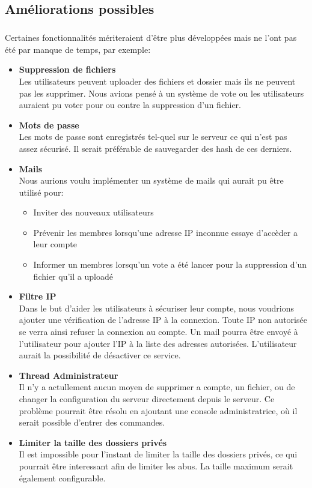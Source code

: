 \documentclass[12pt,a4paper,twoside]{article}
\begin{document}
		\subsection{Améliorations possibles} %
			\subparagraph*{}
				Certaines fonctionnalités mériteraient d'être plus développées mais ne l'ont pas été par manque de temps, par exemple:
				\begin{itemize}
					\item{} \textbf{Suppression de fichiers}\\
						Les utilisateurs peuvent uploader des fichiers et dossier mais ils ne peuvent pas les supprimer. Nous avions pensé à un système de vote ou les utilisateurs auraient pu voter pour ou contre la suppression d'un fichier.
					\item{} \textbf{Mots de passe}\\
						Les mots de passe sont enregistrés tel-quel sur le serveur ce qui n'est pas assez sécurisé. Il serait préférable de sauvegarder des hash de ces derniers.
					\item{} \textbf{Mails}\\
						Nous aurions voulu implémenter un système de mails qui aurait pu être utilisé pour:
						\begin{itemize}
							\item{} Inviter des nouveaux utilisateurs
							\item{} Prévenir les membres lorsqu'une adresse IP inconnue essaye d'accèder a leur compte
							\item{} Informer un membres lorsqu'un vote a été lancer pour la suppression d'un fichier qu'il a uploadé
						\end{itemize}
					\item{} \textbf{Filtre IP}\\
						Dans le but d'aider les utilisateurs à sécuriser leur compte, nous voudrions ajouter une vérification de l'adresse IP à la connexion. Toute IP non autorisée se verra ainsi refuser la connexion au compte. Un mail pourra être envoyé à l'utilisateur pour ajouter l'IP à la liste des adresses autorisées. L'utilisateur aurait la possibilité de désactiver ce service.
					\item{} \textbf{Thread Administrateur}\\
						Il n'y a actullement aucun moyen de supprimer a compte, un fichier, ou de changer la configuration du serveur directement depuis le serveur. Ce problème pourrait être résolu en ajoutant une console administratrice, où il serait possible d'entrer des commandes.
					\item{} \textbf{Limiter la taille des dossiers privés}\\
						Il est impossible pour l'instant de limiter la taille des dossiers privés, ce qui pourrait être interessant afin de limiter les abus. La taille maximum serait également configurable.
				\end{itemize}
\end{document}
